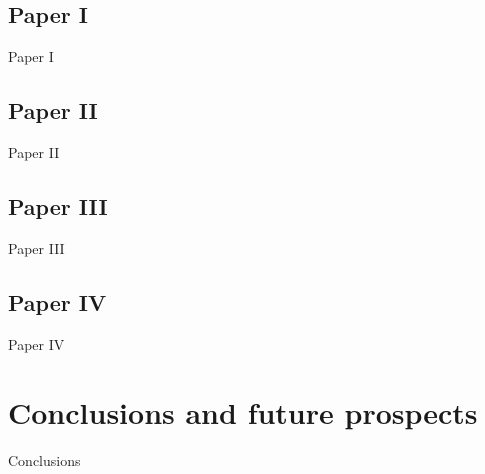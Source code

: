 \documentclass[a4paper,11pt,english]{report}
\begin{document}
\section{Paper I}
Paper I

\section{Paper II}
Paper II

\section{Paper III}
Paper III

\section{Paper IV}
Paper IV

\chapter{Conclusions and future prospects}
Conclusions




\end{document}
